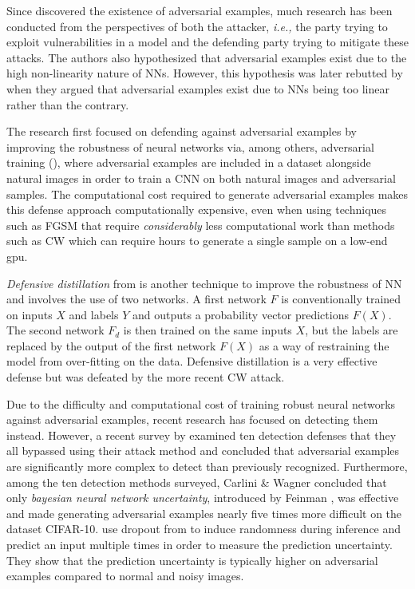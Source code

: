 Since \cite{szegedy_intriguing_2014} discovered the existence of adversarial
examples, much research has been conducted from the perspectives of both the
attacker, \emph{i.e.,} the party trying to exploit vulnerabilities in a model
and the defending party trying to mitigate these attacks. The authors also
hypothesized that adversarial examples exist due to the high non-linearity
nature of NNs. However, this hypothesis was later rebutted by
\cite{goodfellow_explaining_2015} when they argued that adversarial examples
exist due to NNs being too linear rather than the contrary.

The research first focused on defending against adversarial examples by
improving the robustness of neural networks via, among others, adversarial
training (\cite{goodfellow_explaining_2015,papernot_limitations_2015}), where
adversarial examples are included in a dataset alongside natural images in order
to train a CNN on both natural images and adversarial samples. The computational
cost required to generate adversarial examples makes this defense approach
computationally expensive, even when using techniques such as FGSM that require
\emph{considerably} less computational work than methods such as CW which can
require hours to generate a single sample on a low-end gpu.

\textit{Defensive distillation} from \cite{papernot_distillation_2016} is
another technique to improve the robustness of NN and involves the use of two
networks. A first network $F$ is conventionally trained on inputs $X$ and labels
$Y$ and outputs a probability vector predictions $F(X)$. The second network
$F_{d}$ is then trained on the same inputs $X$, but the labels are replaced by
the output of the first network $F(X)$ as a way of restraining the model from
over-fitting on the data. Defensive distillation is a very effective defense but
was defeated by the more recent CW attack.

Due to the difficulty and computational cost of training robust neural networks
against adversarial examples, recent research has focused on detecting them
instead. However, a recent survey by \cite{carlini_adversarial_2017} examined
ten detection defenses that they all bypassed using their attack method and
concluded that adversarial examples are significantly more complex to detect
than previously recognized. Furthermore, among the ten detection methods
surveyed, Carlini \& Wagner concluded that only \textit{bayesian neural network
    uncertainty}, introduced by Feinman \cite{feinman_detecting_2017}, was effective
and made generating adversarial examples nearly five times more difficult on the
dataset CIFAR-10. \cite{feinman_detecting_2017} use dropout from
\cite{srivastava_dropout_2014} to induce randomness during inference and predict
an input multiple times in order to measure the prediction uncertainty. They
show that the prediction uncertainty is typically higher on adversarial examples
compared to normal and noisy images.

